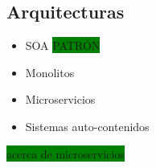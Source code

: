\subsection{Arquitecturas}

\begin{itemize}
  \item SOA \colorbox{green}{PATRÓN}
  \item Monolitos
  \item Microservicios
  \item Sistemas auto-contenidos
\end{itemize}

\colorbox{green}{acerca de microservicios}





